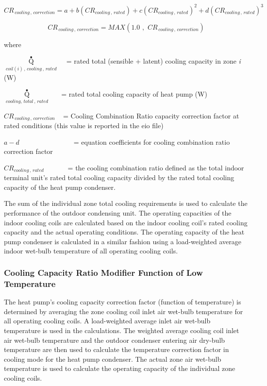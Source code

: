 \begin{equation}
C{R_{\,cooling\,,\,correction}} = a + b\left( {C{R_{cooling\,,\,rated}}} \right) + c{\left( {C{R_{cooling\,,\,rated}}} \right)^2} + d{\left( {C{R_{cooling\,,\,rated}}} \right)^3}
\end{equation}

\begin{equation}
C{R_{\,cooling\,,\,correction}} = MAX\left( {1.0\,\,,\,\,C{R_{\,cooling\,,\,correction}}} \right)
\end{equation}

where

\({\mathop Q\limits^ \bullet_{coil(i)\,,\,cooling\,,\,rated}}\) ~ = rated total (sensible + latent) cooling capacity in zone \emph{i} (W)

\({\mathop Q\limits^ \bullet_{cooling,\,total\,,\,rated}}\) ~~ = rated total cooling capacity of heat pump (W)

\(C{R_{\,cooling\,,\,correction}}\) ~ = Cooling Combination Ratio capacity correction factor at rated conditions (this value is reported in the eio file)

\(a - d\) ~~~~~~~ ~~~~~~~ = equation coefficients for cooling combination ratio correction factor

\(C{R_{cooling\,,\,rated}}\) ~~ ~~~ = the cooling combination ratio defined as the total indoor terminal unit's rated total cooling capacity divided by the rated total cooling capacity of the heat pump condenser.

The sum of the individual zone total cooling requirements is used to calculate the performance of the outdoor condensing unit. The operating capacities of the indoor cooling coils are calculated based on the indoor cooling coil's rated cooling capacity and the actual operating conditions. The operating capacity of the heat pump condenser is calculated in a similar fashion using a load-weighted average indoor wet-bulb temperature of all operating cooling coils.

\subsubsection{Cooling Capacity Ratio Modifier Function of Low Temperature}\label{cooling-capacity-ratio-modifier-function-of-low-temperature}

The heat pump's cooling capacity correction factor (function of temperature) is determined by averaging the zone cooling coil inlet air wet-bulb temperature for all operating cooling coils. A load-weighted average inlet air wet-bulb temperature is used in the calculations. The weighted average cooling coil inlet air wet-bulb temperature and the outdoor condenser entering air dry-bulb temperature are then used to calculate the temperature correction factor in cooling mode for the heat pump condenser. The actual zone air wet-bulb temperature is used to calculate the operating capacity of the individual zone cooling coils.

